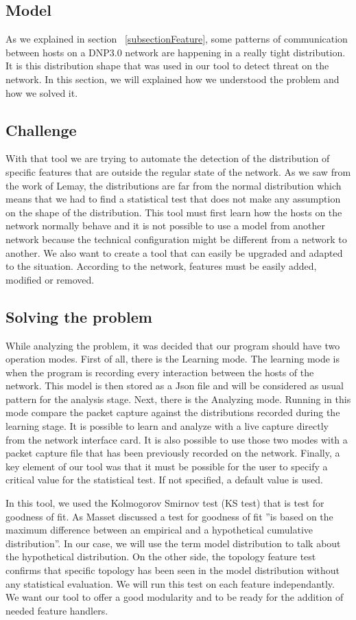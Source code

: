 \documentclass[12pt,journal,compsoc]{IEEEtran}
\begin{document}
\begin{empfile}
\section{Model}
As we explained in section ~\ref{subsectionFeature}, some patterns of communication between hosts on a DNP3.0 network are happening in a really tight distribution. It is this distribution shape that was used in our tool to detect threat on the network. In this section, we will explained how we understood the problem and how we solved it. 

\subsection{Challenge}
With that tool we are trying to automate the detection of the distribution of specific features that are outside the regular state of the network. As we saw from the work of Lemay, the distributions are far from the normal distribution which means that we had to find a statistical test that does not make any assumption on the shape of the distribution. This tool must first learn how the hosts on the network normally behave and it is not possible to use a model from another network because the technical configuration might be different from a network to another. 
We also want to create a tool that can easily be upgraded and adapted to the situation. According to the network, features must be easily added, modified or removed.
\subsection{Solving the problem}
While analyzing the problem, it was decided that our program should have two operation modes. First of all, there is the Learning mode. The learning mode is when the program is recording every interaction between the hosts of the network. This model is then stored as a Json file and will be considered as usual pattern for the analysis stage. Next, there is the Analyzing mode. Running in this mode compare the packet capture against the distributions recorded during the learning stage. It is possible to learn and analyze with a live capture directly from the network interface card. It is also possible to use those two modes with a packet capture file that has been previously recorded on the network. Finally, a key element of our tool was that it must be possible for the user to specify a critical value for the statistical test. If not specified, a default value is used.

In this tool, we used the Kolmogorov Smirnov test (KS test) that is test for goodness of fit. As Masset \cite{kstest} discussed a test for goodness of fit ''is based on the maximum difference between an empirical and a hypothetical cumulative distribution''. In our case, we will use the term model distribution to talk about the hypothetical distribution. 
On the other side, the topology feature test confirms that specific topology has been seen in the model distribution without any statistical evaluation. We will run this test on each feature independantly. We want our tool to offer a good modularity and to be ready for the addition of needed feature handlers.


\end{empfile}
\end{document}
